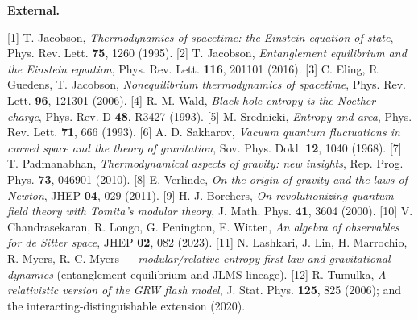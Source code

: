 \documentclass[11pt]{article}
\begin{document}
\textbf{External.}

[1] T. Jacobson, \emph{Thermodynamics of spacetime: the Einstein equation of state}, Phys. Rev. Lett. \textbf{75}, 1260 (1995). [2] T. Jacobson, \emph{Entanglement equilibrium and the Einstein equation}, Phys. Rev. Lett. \textbf{116}, 201101 (2016). [3] C. Eling, R. Guedens, T. Jacobson, \emph{Nonequilibrium thermodynamics of spacetime}, Phys. Rev. Lett. \textbf{96}, 121301 (2006). [4] R. M. Wald, \emph{Black hole entropy is the Noether charge}, Phys. Rev. D \textbf{48}, R3427 (1993). [5] M. Srednicki, \emph{Entropy and area}, Phys. Rev. Lett. \textbf{71}, 666 (1993). [6] A. D. Sakharov, \emph{Vacuum quantum fluctuations in curved space and the theory of gravitation}, Sov. Phys. Dokl. \textbf{12}, 1040 (1968). [7] T. Padmanabhan, \emph{Thermodynamical aspects of gravity: new insights}, Rep. Prog. Phys. \textbf{73}, 046901 (2010). [8] E. Verlinde, \emph{On the origin of gravity and the laws of Newton}, JHEP \textbf{04}, 029 (2011). [9] H.-J. Borchers, \emph{On revolutionizing quantum field theory with Tomita's modular theory}, J. Math. Phys. \textbf{41}, 3604 (2000). [10] V. Chandrasekaran, R. Longo, G. Penington, E. Witten, \emph{An algebra of observables for de Sitter space}, JHEP \textbf{02}, 082 (2023). [11] N. Lashkari, J. Lin, H. Marrochio, R. Myers, R. C. Myers — \emph{modular/relative-entropy first law and gravitational dynamics} (entanglement-equilibrium and JLMS lineage). [12] R. Tumulka, \emph{A relativistic version of the GRW flash model}, J. Stat. Phys. \textbf{125}, 825 (2006); and the interacting-distinguishable extension (2020).
\end{document}

